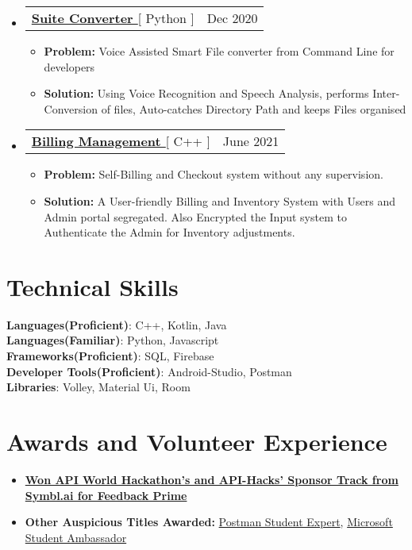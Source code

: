\documentclass[letterpaper,11pt]{article}
\makeatletter
\newcommand{\resumeItem}[1]{
  \item\small{
    {#1 \vspace{-2pt}}
  }
}
\newcommand{\resumeProjectHeading}[2]{
    \item
    \begin{tabular*}{0.97\textwidth}{l@{\extracolsep{\fill}}r}
      \small#1 & #2 \\
    \end{tabular*}\vspace{-7pt}
}
\newcommand{\resumeSubHeadingListStart}{\begin{itemize}[leftmargin=0.15in, label={}]}
\newcommand{\resumeSubHeadingListEnd}{\end{itemize}}
\newcommand{\resumeItemListStart}{\begin{itemize}}
\newcommand{\resumeItemListEnd}{\end{itemize}\vspace{-5pt}}
\makeatother
\begin{document}
\resumeSubHeadingListStart
      \resumeProjectHeading
          {\textbf{\href{https://github.com/aniketk13/Suite-Converter}{Suite Converter }}{[ Python ]}}{Dec 2020}
          \resumeItemListStart
           \resumeItem{\textbf{Problem:} Voice Assisted Smart File converter from Command Line for developers}
           \resumeItem{\textbf{Solution:} Using Voice Recognition and Speech Analysis, performs Inter-Conversion of files, Auto-catches Directory Path and keeps Files organised}
          \resumeItemListEnd
    \resumeSubHeadingListEnd
\resumeSubHeadingListStart
      \resumeProjectHeading
          {\textbf{\href{https://github.com/aniketk13/Billing_Management}{Billing Management }}{[ C++ ]}}{June 2021}
          \resumeItemListStart
          \resumeItem{\textbf{Problem:} Self-Billing and Checkout system without any supervision.}
          \resumeItem{\textbf{Solution:} A User-friendly Billing and Inventory System with Users and Admin portal segregated. Also Encrypted the Input system to Authenticate the Admin for Inventory adjustments.}
          \resumeItemListEnd
    \resumeSubHeadingListEnd


%
\section{Technical Skills}
 \begin{itemize}[leftmargin=0.15in, label={}]
    \small{\item{
     \textbf{Languages(Proficient)}{: C++, Kotlin, Java} \\
      \textbf{Languages(Familiar)}{: Python, Javascript } \\
     \textbf{Frameworks(Proficient)}{: SQL, Firebase  } \\
     \textbf{Developer Tools(Proficient)}{: Android-Studio, Postman } \\
     \textbf{Libraries}{: Volley, Material Ui, Room  }
    }}
 \end{itemize}

\section{Awards and Volunteer Experience }
 \begin{itemize}[leftmargin=0.15in, label={}]
    \small{\item{
        \resumeItemListStart
                \resumeItem{\textbf{\href{https://apihacks.co}{Won API World Hackathon's and API-Hacks' Sponsor Track from Symbl.ai for Feedback Prime} }}
                \resumeItem{\textbf{Other Auspicious Titles Awarded: }\href{https://api.badgr.io/public/assertions/smxpDApNQkawRdyLq88rTA}{ Postman Student Expert}, \href{https://studentambassadors.microsoft.com/en-US/profile/124303}{Microsoft Student Ambassador}}
      \resumeItemListEnd
    }}
 \end{itemize}
 
\end{document}
